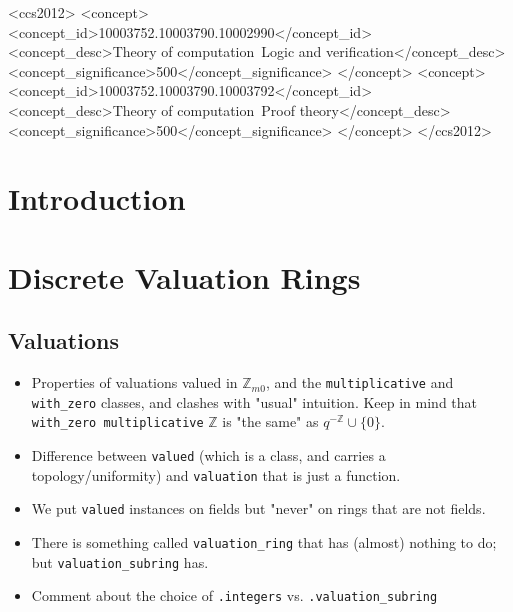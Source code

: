 \documentclass[sigplan,10pt,anonymous,review]{acmart}\settopmatter{printfolios=true,printccs=false,printacmref=false}
\newcommand*{\ZZ}{\mathbb{Z}}
\begin{document}
\begin{CCSXML}
	<ccs2012>
	<concept>
	<concept_id>10003752.10003790.10002990</concept_id>
	<concept_desc>Theory of computation~Logic and verification</concept_desc>
	<concept_significance>500</concept_significance>
	</concept>
	<concept>
	<concept_id>10003752.10003790.10003792</concept_id>
	<concept_desc>Theory of computation~Proof theory</concept_desc>
	<concept_significance>500</concept_significance>
	</concept>
	</ccs2012>
\end{CCSXML}






\maketitle

\section{Introduction}
\section {Discrete Valuation Rings}
\subsection{Valuations}
\begin{itemize}
	\item Properties of valuations valued in $\ZZ_{m0}$, and the \texttt{multiplicative} and \texttt{with\_zero} classes, and clashes with "usual" intuition. Keep in mind that \texttt{with\_zero multiplicative} $\ZZ$ is "the same" as $q^{-\ZZ}\cup \{0\}$.
	\item Difference between \texttt{valued} (which is a class, and carries a topology/uniformity) and \texttt{valuation} that is just a function.
	\item We put \texttt{valued} instances on fields but "never" on rings that are not fields.
	\item There is something called \texttt{valuation\_ring} that has (almost) nothing to do; but \texttt{valuation\_subring} has.
	\item Comment about the choice of \texttt{.integers} vs. \texttt{.valuation\_subring}
\end{itemize}
\end{document}
